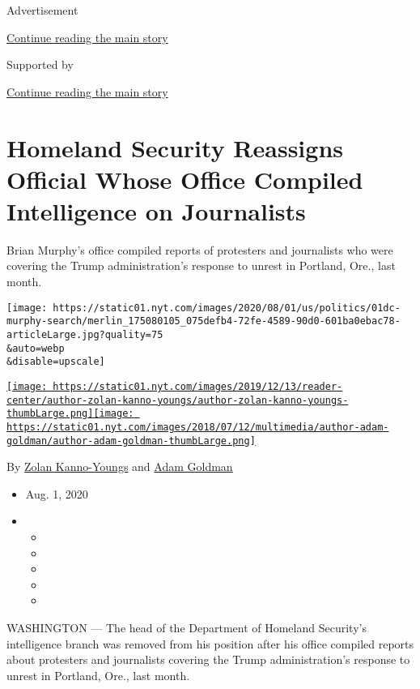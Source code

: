 Advertisement

\protect\hyperlink{after-top}{Continue reading the main story}

Supported by

\protect\hyperlink{after-sponsor}{Continue reading the main story}

\hypertarget{homeland-security-reassigns-official-whose-office-compiled-intelligence-on-journalists}{%
\section{Homeland Security Reassigns Official Whose Office Compiled
Intelligence on
Journalists}\label{homeland-security-reassigns-official-whose-office-compiled-intelligence-on-journalists}}

Brian Murphy's office compiled reports of protesters and journalists who
were covering the Trump administration's response to unrest in Portland,
Ore., last month.

\texttt{[image: https://static01.nyt.com/images/2020/08/01/us/politics/01dc-murphy-search/merlin\_175080105\_075defb4-72fe-4589-90d0-601ba0ebac78-articleLarge.jpg?quality=75\\\&auto=webp\\\&disable=upscale]}

\href{https://www.nytimes.com/by/zolan-kanno-youngs}{\texttt{[image: https://static01.nyt.com/images/2019/12/13/reader-center/author-zolan-kanno-youngs/author-zolan-kanno-youngs-thumbLarge.png]}}\href{https://www.nytimes.com/by/adam-goldman}{\texttt{[image: https://static01.nyt.com/images/2018/07/12/multimedia/author-adam-goldman/author-adam-goldman-thumbLarge.png]}}

By \href{https://www.nytimes.com/by/zolan-kanno-youngs}{Zolan
Kanno-Youngs} and \href{https://www.nytimes.com/by/adam-goldman}{Adam
Goldman}

\begin{itemize}
\item
  Aug. 1, 2020
\item
  \begin{itemize}
  \item
  \item
  \item
  \item
  \item
  \end{itemize}
\end{itemize}

WASHINGTON --- The head of the Department of Homeland Security's
intelligence branch was removed from his position after his office
compiled reports about protesters and journalists covering the Trump
administration's response to unrest in Portland, Ore., last month.

